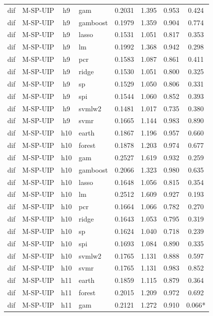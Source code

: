 \begin{ThreePartTable}
\begin{longtable}[t]{llclcccc}
dif & M-SP-UIP & h9 & gam & 0.2031 & 1.395 & 0.953 & 0.424\\
dif & M-SP-UIP & h9 & gamboost & 0.1979 & 1.359 & 0.904 & 0.774\\
dif & M-SP-UIP & h9 & lasso & 0.1531 & 1.051 & 0.817 & 0.353\\
dif & M-SP-UIP & h9 & lm & 0.1992 & 1.368 & 0.942 & 0.298\\
dif & M-SP-UIP & h9 & pcr & 0.1583 & 1.087 & 0.861 & 0.411\\
dif & M-SP-UIP & h9 & ridge & 0.1530 & 1.051 & 0.800 & 0.325\\
dif & M-SP-UIP & h9 & sp & 0.1529 & 1.050 & 0.806 & 0.331\\
dif & M-SP-UIP & h9 & spi & 0.1544 & 1.060 & 0.852 & 0.393\\
dif & M-SP-UIP & h9 & svmlw2 & 0.1481 & 1.017 & 0.735 & 0.380\\
dif & M-SP-UIP & h9 & svmr & 0.1665 & 1.144 & 0.983 & 0.890\\
\addlinespace
dif & M-SP-UIP & h10 & earth & 0.1867 & 1.196 & 0.957 & 0.660\\
dif & M-SP-UIP & h10 & forest & 0.1878 & 1.203 & 0.974 & 0.677\\
dif & M-SP-UIP & h10 & gam & 0.2527 & 1.619 & 0.932 & 0.259\\
dif & M-SP-UIP & h10 & gamboost & 0.2066 & 1.323 & 0.980 & 0.635\\
dif & M-SP-UIP & h10 & lasso & 0.1648 & 1.056 & 0.815 & 0.354\\
dif & M-SP-UIP & h10 & lm & 0.2512 & 1.609 & 0.927 & 0.193\\
dif & M-SP-UIP & h10 & pcr & 0.1664 & 1.066 & 0.782 & 0.270\\
dif & M-SP-UIP & h10 & ridge & 0.1643 & 1.053 & 0.795 & 0.319\\
dif & M-SP-UIP & h10 & sp & 0.1624 & 1.040 & 0.718 & 0.239\\
dif & M-SP-UIP & h10 & spi & 0.1693 & 1.084 & 0.890 & 0.335\\
dif & M-SP-UIP & h10 & svmlw2 & 0.1765 & 1.131 & 0.888 & 0.597\\
dif & M-SP-UIP & h10 & svmr & 0.1765 & 1.131 & 0.983 & 0.852\\
\addlinespace
dif & M-SP-UIP & h11 & earth & 0.1859 & 1.115 & 0.879 & 0.364\\
dif & M-SP-UIP & h11 & forest & 0.2015 & 1.209 & 0.972 & 0.692\\
dif & M-SP-UIP & h11 & gam & 0.2121 & 1.272 & 0.910 & 0.066*\\

\end{longtable}
\end{ThreePartTable}
